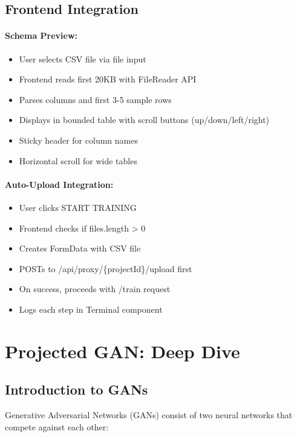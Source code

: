 \documentclass[11pt,a4paper]{article}
\begin{document}
\subsection{Frontend Integration}

\paragraph{Schema Preview:}
\begin{itemize}[noitemsep]
    \item User selects CSV file via file input
    \item Frontend reads first 20KB with FileReader API
    \item Parses columns and first 3-5 sample rows
    \item Displays in bounded table with scroll buttons (up/down/left/right)
    \item Sticky header for column names
    \item Horizontal scroll for wide tables
\end{itemize}

\paragraph{Auto-Upload Integration:}
\begin{itemize}[noitemsep]
    \item User clicks START TRAINING
    \item Frontend checks if files.length > 0
    \item Creates FormData with CSV file
    \item POSTs to /api/proxy/\{projectId\}/upload first
    \item On success, proceeds with /train request
    \item Logs each step in Terminal component
\end{itemize}

\section{Projected GAN: Deep Dive}

\subsection{Introduction to GANs}

Generative Adversarial Networks (GANs) consist of two neural networks that compete against each other:
\end{document}
